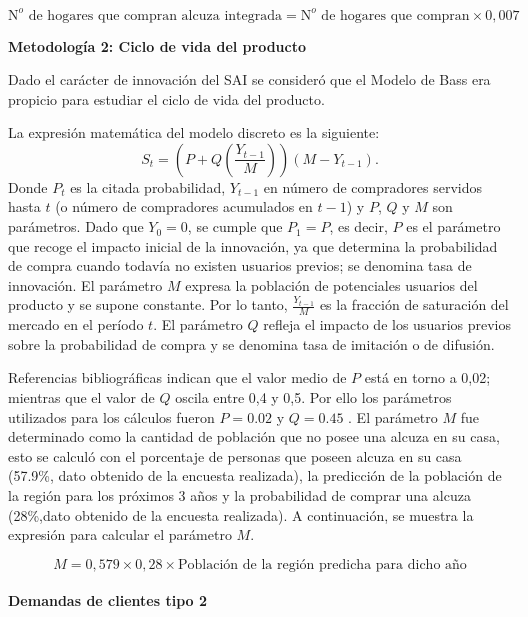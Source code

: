 \begin{equation*}
\mbox{N}^o\mbox{ de hogares que compran alcuza integrada} = \mbox{N}^o\mbox{ de hogares que compran}\times 0,007
\end{equation*}

\textbf{Metodología 2:  Ciclo de vida del producto}

Dado el carácter de innovación del SAI se consideró que el Modelo de Bass era propicio para estudiar el ciclo de vida del producto.

La expresión matemática del modelo discreto es la siguiente:
\begin{equation*}
S_t=(P+Q(\frac{Y_{t-1}}{M}))(M-Y_{t-1}).
\end{equation*}
Donde $P_t$ es la citada probabilidad, $Y_{t-1} $ en número de compradores servidos hasta $t$ (o número de compradores acumulados en $t-1$) y $P$, $Q$ y $M$ son parámetros. Dado que $Y_0=0$, se cumple que $P_1=P$, es decir, $P$ es el parámetro que recoge el impacto inicial de la innovación, ya que determina la probabilidad de compra cuando todavía no existen usuarios previos; se denomina tasa de innovación. El parámetro $M$ expresa la población de potenciales usuarios del producto y se supone constante. Por lo tanto, $\frac{Y_{t-1}}{M}$ es la fracción de saturación del mercado en el período $t$. El parámetro $Q$ refleja el impacto de los usuarios previos sobre la probabilidad de compra y se denomina tasa de imitación o de difusión.


Referencias bibliográficas \cite{aleman2007estrategias} indican que el valor medio de $P$ está en torno a 0,02; mientras que el valor de $Q$ oscila entre 0,4 y 0,5. Por ello los parámetros utilizados para los cálculos fueron $P=0.02$ y $Q=0.45$ . El parámetro $M$ fue determinado como la cantidad de población que no posee una alcuza en su casa, esto se calculó con el porcentaje de personas que poseen alcuza en su casa (57.9\%, dato obtenido de la encuesta realizada), la predicción de la población de la región para los próximos 3 años y la probabilidad de comprar una alcuza (28\%,dato obtenido de la encuesta realizada). A continuación, se muestra la expresión para calcular el parámetro $M$.

\begin{equation*}
M=0,579\times 0,28 \times \mbox{Población de la región predicha para dicho año}
\end{equation*}

\paragraph{Demandas de clientes tipo 2}

